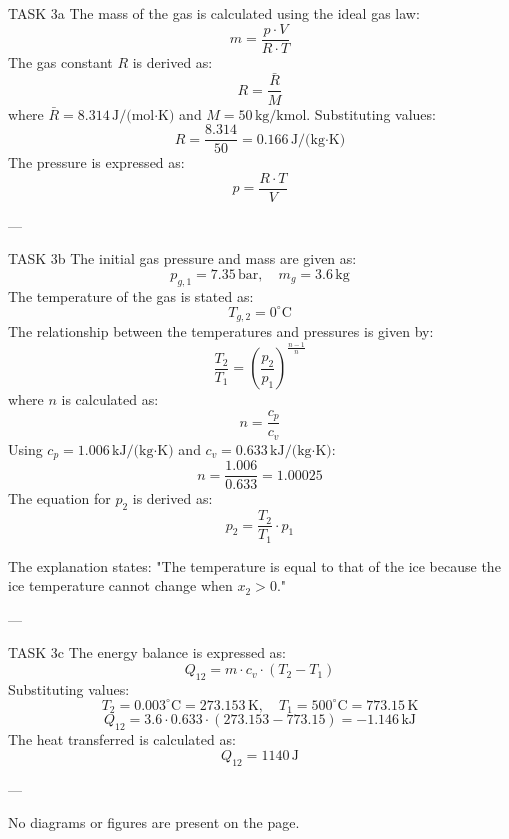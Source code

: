 TASK 3a  
The mass of the gas is calculated using the ideal gas law:  
\[
m = \frac{p \cdot V}{R \cdot T}
\]  
The gas constant \( R \) is derived as:  
\[
R = \frac{\bar{R}}{M}
\]  
where \( \bar{R} = 8.314 \, \text{J/(mol·K)} \) and \( M = 50 \, \text{kg/kmol} \). Substituting values:  
\[
R = \frac{8.314}{50} = 0.166 \, \text{J/(kg·K)}
\]  
The pressure is expressed as:  
\[
p = \frac{R \cdot T}{V}
\]  

---

TASK 3b  
The initial gas pressure and mass are given as:  
\[
p_{g,1} = 7.35 \, \text{bar}, \quad m_g = 3.6 \, \text{kg}
\]  
The temperature of the gas is stated as:  
\[
T_{g,2} = 0^\circ\text{C}
\]  
The relationship between the temperatures and pressures is given by:  
\[
\frac{T_2}{T_1} = \left( \frac{p_2}{p_1} \right)^{\frac{n-1}{n}}
\]  
where \( n \) is calculated as:  
\[
n = \frac{c_p}{c_v}
\]  
Using \( c_p = 1.006 \, \text{kJ/(kg·K)} \) and \( c_v = 0.633 \, \text{kJ/(kg·K)} \):  
\[
n = \frac{1.006}{0.633} = 1.00025
\]  
The equation for \( p_2 \) is derived as:  
\[
p_2 = \frac{T_2}{T_1} \cdot p_1
\]  

The explanation states: "The temperature is equal to that of the ice because the ice temperature cannot change when \( x_2 > 0 \)."  

---

TASK 3c  
The energy balance is expressed as:  
\[
Q_{12} = m \cdot c_v \cdot (T_2 - T_1)
\]  
Substituting values:  
\[
T_2 = 0.003^\circ\text{C} = 273.153 \, \text{K}, \quad T_1 = 500^\circ\text{C} = 773.15 \, \text{K}
\]  
\[
Q_{12} = 3.6 \cdot 0.633 \cdot (273.153 - 773.15) = -1.146 \, \text{kJ}
\]  
The heat transferred is calculated as:  
\[
Q_{12} = 1140 \, \text{J}
\]  

---

No diagrams or figures are present on the page.